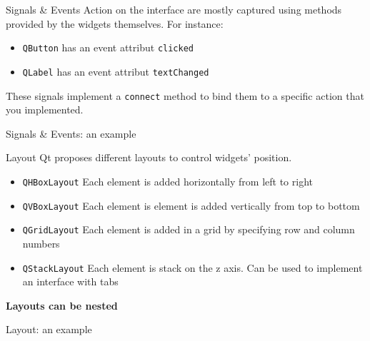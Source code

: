 \begin{frame}{Signals \& Events}
    Action on the interface are mostly captured using methods provided by the widgets themselves. For instance:
    \begin{itemize}
        \item \texttt{QButton} has an event attribut \texttt{clicked}
        \item \texttt{QLabel} has an event attribut \texttt{textChanged}
    \end{itemize} 
    
    These signals implement a \texttt{connect} method to bind them to a specific action that you implemented.
    
\end{frame}

\begin{frame}{Signals \& Events: an example}

    
\end{frame}

\begin{frame}{Layout}
    Qt proposes different layouts to control widgets' position.
    \begin{itemize}
        \item \texttt{QHBoxLayout} Each element is added horizontally from left to right
        \item \texttt{QVBoxLayout} Each element is element is added vertically from top to bottom
        \item \texttt{QGridLayout} Each element is added in a grid by specifying row and column numbers
        \item \texttt{QStackLayout} Each element is stack on the z axis. Can be used to implement an interface with tabs
    \end{itemize}
    \centering\alert{\textbf{Layouts can be nested}}
    
\end{frame}

\begin{frame}{Layout: an example}
    
    
\end{frame}